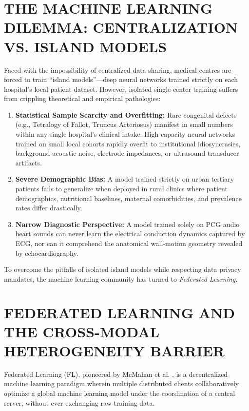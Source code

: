 \documentclass[12pt,a4paper]{amritareport}
\begin{document}
\section{THE MACHINE LEARNING DILEMMA: CENTRALIZATION VS. ISLAND MODELS}

Faced with the impossibility of centralized data sharing, medical centres are forced to train ``island models''—deep neural networks trained strictly on each hospital's local patient dataset. However, isolated single-center training suffers from crippling theoretical and empirical pathologies:
\begin{enumerate}
	\item \textbf{Statistical Sample Scarcity and Overfitting:} Rare congenital defects (e.g., Tetralogy of Fallot, Truncus Arteriosus) manifest in small numbers within any single hospital's clinical intake. High-capacity neural networks trained on small local cohorts rapidly overfit to institutional idiosyncrasies, background acoustic noise, electrode impedances, or ultrasound transducer artifacts.
	\item \textbf{Severe Demographic Bias:} A model trained strictly on urban tertiary patients fails to generalize when deployed in rural clinics where patient demographics, nutritional baselines, maternal comorbidities, and prevalence rates differ drastically.
	\item \textbf{Narrow Diagnostic Perspective:} A model trained solely on PCG audio heart sounds can never learn the electrical conduction dynamics captured by ECG, nor can it comprehend the anatomical wall-motion geometry revealed by echocardiography.
\end{enumerate}

To overcome the pitfalls of isolated island models while respecting data privacy mandates, the machine learning community has turned to \textit{Federated Learning}.


\section{FEDERATED LEARNING AND THE CROSS-MODAL HETEROGENEITY BARRIER}

Federated Learning (FL), pioneered by McMahan et al. \cite{mcmahan2017communication}, is a decentralized machine learning paradigm wherein multiple distributed clients collaboratively optimize a global machine learning model under the coordination of a central server, without ever exchanging raw training data. 
\end{document}

